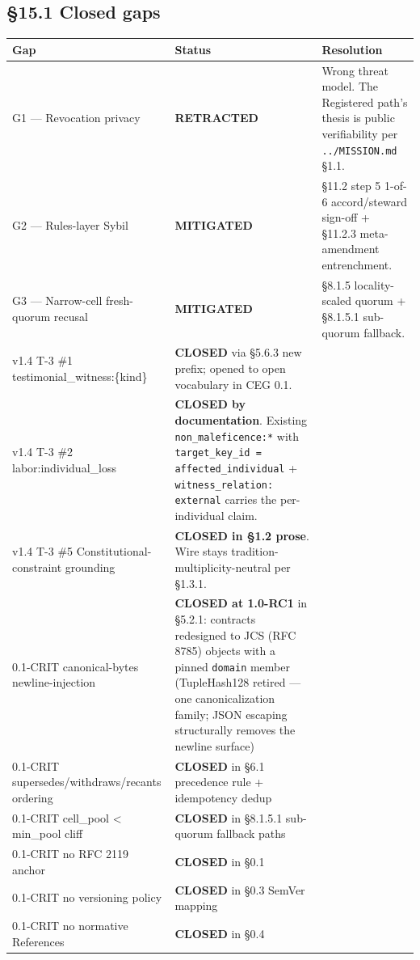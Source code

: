 \documentclass[11pt]{article}
\begin{document}
\subsection*{§15.1 Closed gaps}


{\footnotesize
\begin{longtable}{|p{5.33cm}|p{5.33cm}|p{5.33cm}|}\hline
\textbf{Gap} & \textbf{Status} & \textbf{Resolution} \\ \hline\endhead
G1 — Revocation privacy & \textbf{RETRACTED} & Wrong threat model. The Registered path's thesis is public verifiability per \texttt{../MISSION.md} §1.1. \\ \hline
G2 — Rules-layer Sybil & \textbf{MITIGATED} & §11.2 step 5 1-of-6 accord/steward sign-off + §11.2.3 meta-amendment entrenchment. \\ \hline
G3 — Narrow-cell fresh-quorum recusal & \textbf{MITIGATED} & §8.1.5 locality-scaled quorum + §8.1.5.1 sub-quorum fallback. \\ \hline
v1.4 T-3 \#1 testimonial\_witness:\{kind\} & \textbf{CLOSED} via §5.6.3 new prefix; opened to open vocabulary in CEG 0.1. &  \\ \hline
v1.4 T-3 \#2 labor:individual\_loss & \textbf{CLOSED by documentation}. Existing \texttt{non\_maleficence:*} with \texttt{target\_key\_id = affected\_individual} + \texttt{witness\_relation: external} carries the per-individual claim. &  \\ \hline
v1.4 T-3 \#5 Constitutional-constraint grounding & \textbf{CLOSED in §1.2 prose}. Wire stays tradition-multiplicity-neutral per §1.3.1. &  \\ \hline
0.1-CRIT canonical-bytes newline-injection & \textbf{CLOSED at 1.0-RC1} in §5.2.1: contracts redesigned to JCS (RFC 8785) objects with a pinned \texttt{domain} member (TupleHash128 retired — one canonicalization family; JSON escaping structurally removes the newline surface) &  \\ \hline
0.1-CRIT supersedes/withdraws/recants ordering & \textbf{CLOSED} in §6.1 precedence rule + idempotency dedup &  \\ \hline
0.1-CRIT cell\_pool < min\_pool cliff & \textbf{CLOSED} in §8.1.5.1 sub-quorum fallback paths &  \\ \hline
0.1-CRIT no RFC 2119 anchor & \textbf{CLOSED} in §0.1 &  \\ \hline
0.1-CRIT no versioning policy & \textbf{CLOSED} in §0.3 SemVer mapping &  \\ \hline
0.1-CRIT no normative References & \textbf{CLOSED} in §0.4 &  \\ \hline

\end{longtable}}
\end{document}
